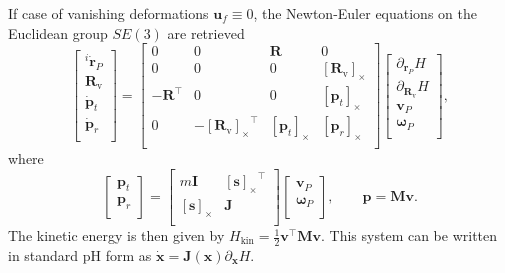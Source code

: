 \documentclass{svjour3}                     %
\newcommand{\crmat}[1]{\ensuremath{[#1]_{\times}}}
\begin{document}
\begin{remark}
	If case of vanishing deformations $\bm{u}_f \equiv 0$, the Newton-Euler equations on the Euclidean group $SE(3)$ are retrieved \cite{celledoni2018passivity}
	\begin{equation*}
	\begin{bmatrix}
	^i\dot{\bm{r}}_P \\ \bm{R}_{\text{v}} \\\dot{\bm{p}}_t \\ \dot{\bm{p}}_r \\
	\end{bmatrix} = 
	\begin{bmatrix}
	0 & 0 & \bm{R} & 0 \\
	0 & 0 & 0 & \crmat{\bm{R}_{\text{v}}} \\
	- \bm{R}^\top & 0 & 0 & \crmat{\bm{p}_t}\\
	0 & -\crmat{\bm{R}_{\text{v}}}^\top & \crmat{\bm{p}_t} & \crmat{\bm{p}_r} \\
	\end{bmatrix}
	\begin{bmatrix}
	\partial_{\bm{r}_P} H \\ \partial_{\bm{R}_{\text{v}}} H \\ \bm{v}_P \\ \bm{\omega}_P  \\
	\end{bmatrix},
	\end{equation*}
	where
	\begin{equation*}
	\begin{bmatrix}
	\bm{p}_t \\ \bm{p}_r \\ 
	\end{bmatrix} = 
	\begin{bmatrix}
	m \bm{I} & \crmat{\bm{s}}^\top \\
	\crmat{\bm{s}} & \bm{J} \\
	\end{bmatrix}
	\begin{bmatrix}
	\bm{v}_P \\ \bm{\omega}_P  \\ 
	\end{bmatrix}, \qquad \bm{p} = \bm{M} \bm{v}.
	\end{equation*}
	The kinetic energy is then given by $H_{\text{kin}} = \frac{1}{2} \bm{v}^\top \bm{M} \bm{v}$.
	This system can be written in standard pH form as $\dot{\bm{x}} = \bm{J}(\bm{x})\partial_{\bm{x}} H$.
\end{remark}
\end{document}
